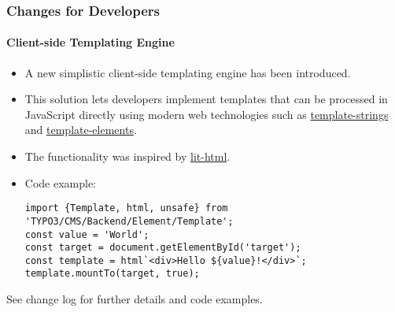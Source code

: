 %

\begin{frame}[fragile]
	\frametitle{Changes for Developers}
	\framesubtitle{Client-side Templating Engine}

	\lstset{basicstyle=\tiny\ttfamily}

	\begin{itemize}
		\item A new simplistic client-side templating engine has been introduced.
		\item This solution lets developers implement templates that can be processed
			in JavaScript directly using modern web technologies such as
			\href{https://developer.mozilla.org/en-US/docs/Web/JavaScript/Reference/Template\_literals}{template-strings}
			and
			\href{https://developer.mozilla.org/en-US/docs/Web/HTML/Element/template}{template-elements}.
		\item The functionality was inspired by \href{https://lit-html.polymer-project.org/}{lit-html}.
		\item Code example:
\begin{lstlisting}
import {Template, html, unsafe} from 'TYPO3/CMS/Backend/Element/Template';
const value = 'World';
const target = document.getElementById('target');
const template = html`<div>Hello ${value}!</div>`;
template.mountTo(target, true);
\end{lstlisting}
	\end{itemize}
		\item See change log for further details and code examples.
\end{frame}

